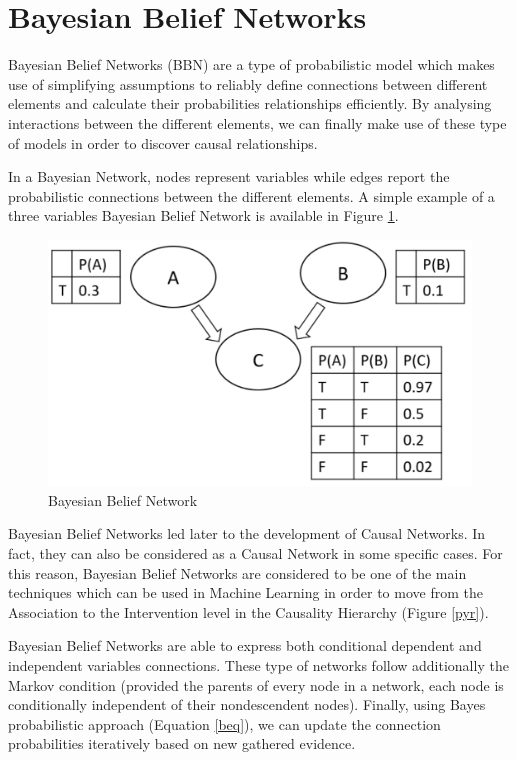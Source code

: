 \section{Bayesian Belief Networks}
\label{bbn_ref}
Bayesian Belief Networks (BBN) are a type of probabilistic model which makes use of simplifying assumptions to reliably define connections between different elements and calculate their probabilities relationships efficiently. By analysing interactions between the different elements, we can finally make use of these type of models in order to discover causal relationships. 

In a Bayesian Network, nodes represent variables while edges report the probabilistic connections between the different elements. A simple example of a three variables Bayesian Belief Network is available in Figure \ref{net}. 

\vspace{-0.5cm}
\begin{figure}[ht!]%
    \centering
    \includegraphics[width=0.7\linewidth]{latex/images/bayes.pdf}
    \vspace{-0.2cm}
    \caption{Bayesian Belief Network}
    \label{net}
\end{figure}
\vspace{-0.7cm}

Bayesian Belief Networks led later to the development of Causal Networks. In fact, they can also be considered as a Causal Network in some specific cases. For this reason, Bayesian Belief Networks are considered to be one of the main techniques which can be used in Machine Learning in order to move from the Association to the Intervention level in the Causality Hierarchy (Figure \ref{pyr}).

Bayesian Belief Networks are able to express both conditional dependent and independent variables connections. These type of networks follow additionally the Markov condition \cite{markov} (provided the parents of every node in a network, each node is conditionally independent of their nondescendent nodes).  Finally, using Bayes probabilistic approach (Equation \ref{beq}), we can update the connection probabilities iteratively based on new gathered evidence.

